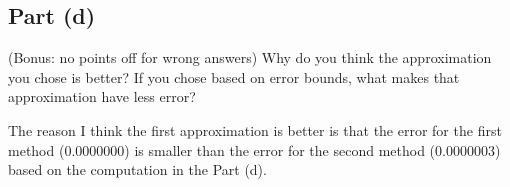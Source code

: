 \subsection{Part (d)}

\begin{question}
   (Bonus: no points off for wrong answers) Why do you think the approximation you chose is better? If you chose based on error bounds, what makes that approximation have less error?
\end{question}
    
\begin{answer}
    The reason I think the first approximation is better is that the error for the first method (0.0000000) is smaller than the error for the second method (0.0000003) based on the computation in the Part (d).
\end{answer}